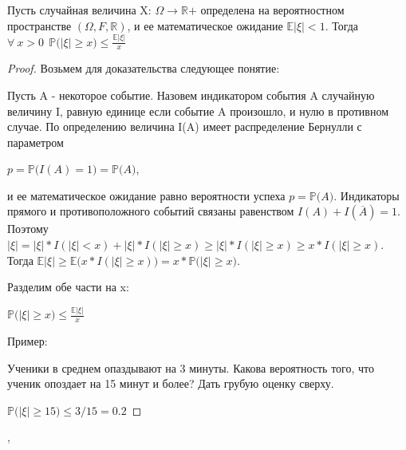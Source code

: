 \documentclass[a4paper,12pt]{article}
\begin{document}
   \begin{theorem}
   Пусть случайная величина X: $\Omega \rightarrow \mathbb R\mathrm+$ определена на вероятностном пространстве $(\Omega, F, \mathbb R)$, и ее математическое ожидание $\mathbb E\mathrm |\xi|<\mathcal {1}$. Тогда
 $\forall ~x > 0~~ \mathbb P\mathrm(|\xi| \ge x)\le \frac {\mathbb E\mathrm |\xi|}{x}$
 
    \end{theorem}
    \begin{proof}
    
    Возьмем для доказательства следующее понятие:
    
Пусть A - некоторое событие. Назовем индикатором события A случайную величину I, равную единице если событие A произошло, и нулю в противном случае. По определению величина I(A) имеет распределение Бернулли с параметром

 $p = \mathbb P\mathrm (I(A) = 1) = \mathbb P\mathrm (A)$, 
 
и ее математическое ожидание равно вероятности успеха  $p = \mathbb P\mathrm (A)$. Индикаторы прямого и противоположного событий связаны равенством $I(A) + I(\overline A) = 1$. Поэтому
 $|\xi|=|\xi|*I(|\xi|<x)+|\xi|*I(|\xi|\ge x)\ge |\xi|*I(|\xi|\ge x)\ge x*I(|\xi| \ge x)$.
Тогда
 $\mathbb E\mathrm |\xi|\ge \mathbb E\mathrm(x*I(|\xi|\ge x)) = x*\mathbb P\mathrm (|\xi|\ge x)$.
 
Разделим обе части на x:

$\mathbb P\mathrm(|\xi| \ge x)\le \frac {\mathbb E\mathrm |\xi|}{x}$

Пример:

Ученики в среднем опаздывают на 3 минуты. Какова вероятность того, что ученик опоздает на 15 минут и более? Дать грубую оценку сверху.

 $\mathbb P\mathrm (|\xi|\ge 15)\le 3/15 = 0.2$
    
    \end{proof}
    \sep
\end{document}
